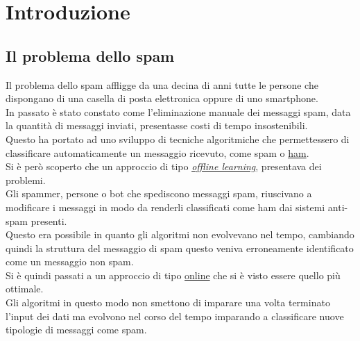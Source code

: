 \newpage
\section{Introduzione}

\subsection{Il problema dello spam}
Il problema dello spam affligge da una decina di anni tutte le persone che dispongano di una casella di posta elettronica oppure di uno smartphone.\\
In passato è stato constato come l'eliminazione manuale dei messaggi spam, data la quantità di messaggi inviati, presentasse costi di tempo insostenibili.\\
Questo ha portato ad uno sviluppo di tecniche algoritmiche che permettessero di classificare automaticamente un messaggio ricevuto, come spam o \href{https://en.wiktionary.org/wiki/ham_e-mail}{ham}.\\
Si è però scoperto che un approccio di tipo \href{https://en.wikipedia.org/wiki/Offline_learning}{\textit{offline learning}}, presentava dei problemi.\\
Gli spammer, persone o bot che spediscono messaggi spam, riuscivano a modificare i messaggi in modo da renderli classificati come ham dai sistemi anti-spam presenti.\\
Questo era possibile in quanto gli algoritmi non evolvevano nel tempo, cambiando quindi la struttura del messaggio di spam questo veniva erroneamente identificato come un messaggio non spam.\\
Si è quindi passati a un approccio di tipo \href{https://en.wikipedia.org/wiki/Online_algorithm}{online} che si è visto essere quello più ottimale.\\
Gli algoritmi in questo modo non smettono di imparare una volta terminato l'input dei dati ma evolvono nel corso del tempo imparando a classificare nuove tipologie di messaggi come spam. 
